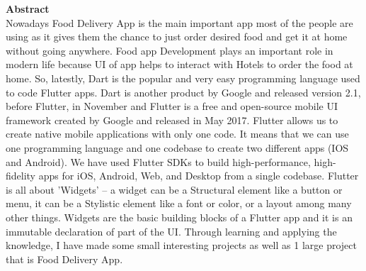 {\Huge \centering \textbf{Abstract}\\}
\vspace{0.5in}
Nowadays Food Delivery App is the main important app most of the people are using as it gives them the chance to just order desired food and get it at home without going anywhere. Food app Development plays an important role in modern life because UI of app helps to interact with Hotels to order the food at home. So, latestly, Dart is the popular and very easy programming language used to code Flutter apps. Dart is another product by Google and released version 2.1, before Flutter, in November and Flutter is a free and open-source mobile UI framework created by Google and released in May 2017. Flutter allows us to create native mobile applications with only one code. It means that we can use one programming language and one codebase to create two different apps (IOS and Android). We have used Flutter SDKs to  build high-performance, high-fidelity apps for iOS, Android, Web, and Desktop from a single codebase. Flutter is all about 'Widgets' -- a widget can be a Structural element like a button or menu, it can be a Stylistic element like a font or color, or a layout among many other things. Widgets are the basic building blocks of a Flutter app and it is an immutable declaration of part of the UI. Through learning and applying the knowledge, I have made some small interesting projects as well as 1 large project that is Food Delivery App.


